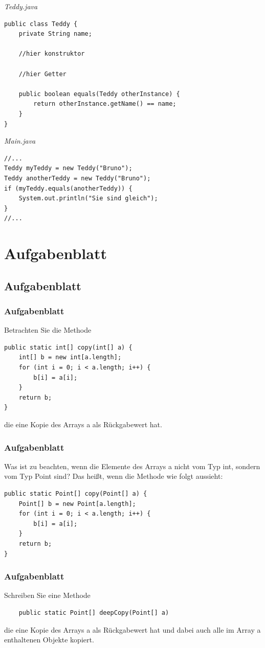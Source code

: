 \documentclass[18pt]{beamer}
\begin{document}
\begin{frame}[containsverbatim]
\emph{Teddy.java}
\begin{lstlisting}
public class Teddy {
	private String name;
	
	//hier konstruktor
	
	//hier Getter
	
	public boolean equals(Teddy otherInstance) {
		return otherInstance.getName() == name;
	}
}
\end{lstlisting}

\emph{Main.java}
\begin{lstlisting}
//...
Teddy myTeddy = new Teddy("Bruno");
Teddy anotherTeddy = new Teddy("Bruno");
if (myTeddy.equals(anotherTeddy)) {
	System.out.println("Sie sind gleich");
}
//...
\end{lstlisting}
\end{frame}

\section{Aufgabenblatt}
\subsection{Aufgabenblatt}
\begin{frame}[containsverbatim]
\frametitle{Aufgabenblatt}
Betrachten Sie die Methode
\begin{lstlisting}
public static int[] copy(int[] a) {
	int[] b = new int[a.length];
	for (int i = 0; i < a.length; i++) {
		b[i] = a[i];
	}
	return b;
}
\end{lstlisting}
die eine Kopie des Arrays a als Rückgabewert hat.
\end{frame}

\begin{frame}[containsverbatim] 
\frametitle{Aufgabenblatt}
Was ist zu beachten, wenn die Elemente des Arrays a nicht vom Typ int, sondern vom Typ Point sind? Das heißt, wenn die Methode wie folgt aussieht:
\begin{lstlisting}
public static Point[] copy(Point[] a) {
	Point[] b = new Point[a.length];
	for (int i = 0; i < a.length; i++) {
		b[i] = a[i];
	}
	return b;
}
\end{lstlisting}
\end{frame}

\begin{frame}[containsverbatim]
\frametitle{Aufgabenblatt}
Schreiben Sie eine Methode
\begin{lstlisting}
	public static Point[] deepCopy(Point[] a)
\end{lstlisting}
die eine Kopie des Arrays a als Rückgabewert hat und dabei auch alle im Array a enthaltenen
Objekte kopiert.
\end{frame}
\end{document}
